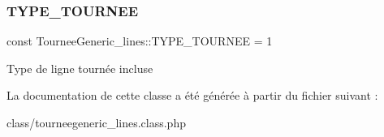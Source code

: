 \subsubsection{\texorpdfstring{T\+Y\+P\+E\+\_\+\+T\+O\+U\+R\+N\+EE}{TYPE\_TOURNEE}}
{\footnotesize\ttfamily const Tournee\+Generic\+\_\+lines\+::\+T\+Y\+P\+E\+\_\+\+T\+O\+U\+R\+N\+EE = 1}

Type de ligne tournée incluse 

La documentation de cette classe a été générée à partir du fichier suivant \+:\begin{DoxyCompactItemize}
\item 
class/tourneegeneric\+\_\+lines.\+class.\+php\end{DoxyCompactItemize}
